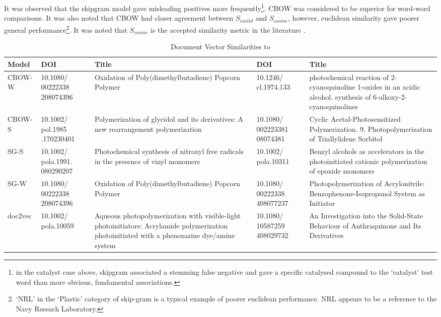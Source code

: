 It was observed that the skipgram model gave misleading positives more frequently\footnote{in the catalyst case above, skipgram associated a stemming false negative and gave a specific catalysed compound to the `catalyst' test word than more obvious, fundamental associations.}. CBOW  was considered to be superior for word-word comparisons. It was also noted that CBOW had closer agreement between $S_{euclid}$ and $S_{cosine}$, however, euclidean similarity gave poorer general performance\footnote{`NRL' in the `Plastic' category of skip-gram is a typical example of poorer euclidean performance. NRL appears to be a reference to the Navy Reseach Laboratory. }. It was noted that $S_{cosine}$ is the accepted similarity metric in the literature \cite{word2vec1}\cite{word2vec2}\cite{doc2vec}.
\newpage
\begin{table}[H]
\centering
\caption[Examination of Document Vector similarities]{Document Vector Similarities to \cite{docassay}}
\label{tab:DOCSIMS}
\begin{tabular}{|l|p{2cm}|p{4cm}|p{2cm}|p{4cm}|}
\hline
Model           & DOI            & Title            & DOI              & Title              \\ \hline
CBOW-W               & 10.1080/ 00222338 208074396         & \footnotesize{Oxidation of Poly(dimethylbutadiene) Popcorn Polymer} &  10.1246/ cl.1974.133               &                   \footnotesize{photochemical reaction of 2-cyanoquinoline 1-oxides in an acidic alcohol. synthesis of 6-alkoxy-2-cyanoquinolines} \\ \hline
CBOW-S               & 10.1002/ pol.1985 .170230401          &  \footnotesize{Polymerization of glycidol and its derivatives: A new rearrangement polymerization}
                & 10.1080/ 002223381 08074381                & \footnotesize{Cyclic Acetal-Photosensitized Polymerization. 9. Photopolymerization of Triallylidene Sorbitol}
                   \\ \hline
SG-S                 & 10.1002/ pola.1991. 080290207            &   \footnotesize{Photochemical synthesis of nitroxyl free radicals in the presence of vinyl monomers}
               &  10.1002/ pola.10311              &  \footnotesize{Benzyl alcohols as accelerators in the photoinitiated cationic polymerization of epoxide monomers}
                  \\ \hline
SG-W                 & 10.1080/ 00222338 208074396            &    \footnotesize{Oxidation of Poly(dimethylbutadiene) Popcorn Polymer}
              & 10.1080/ 00222338 408077237                &  \footnotesize{Photopolymerization of Acrylonitrile: Benzophenone-Isopropanol System as Initiator}
                 \\ \hline
doc2vec                    &  10.1002/ pola.10059              &  \footnotesize{Aqueous photopolymerization with visible-light photoinitiators: Acrylamide polymerization photoinitiated with a phenoxazine dye/amine system}
                & 10.1080/ 10587259 408029732                 & \footnotesize{ An Investigation into the Solid-State Behaviour of Anthraquinone and Its Derivatives}
                 \\ \hline
\end{tabular}
\end{table}

